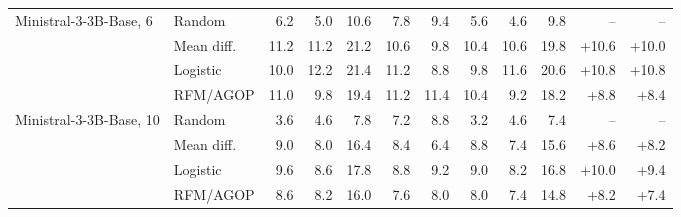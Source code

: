 \begin{table}[t]
\begin{tabular}{llrrrrrrrrrr}
\midrule
Ministral-3-3B-Base, 6 & Random & 6.2 & 5.0 & 10.6 & 7.8 & 9.4 & 5.6 & 4.6 & 9.8 & -- & -- \\
 & Mean diff. & 11.2 & 11.2 & 21.2 & 10.6 & 9.8 & 10.4 & 10.6 & 19.8 & +10.6 & +10.0 \\
 & Logistic & 10.0 & 12.2 & 21.4 & 11.2 & 8.8 & 9.8 & 11.6 & 20.6 & +10.8 & +10.8 \\
 & RFM/AGOP & 11.0 & 9.8 & 19.4 & 11.2 & 11.4 & 10.4 & 9.2 & 18.2 & +8.8 & +8.4 \\
\addlinespace[0.8pt]
Ministral-3-3B-Base, 10 & Random & 3.6 & 4.6 & 7.8 & 7.2 & 8.8 & 3.2 & 4.6 & 7.4 & -- & -- \\
 & Mean diff. & 9.0 & 8.0 & 16.4 & 8.4 & 6.4 & 8.8 & 7.4 & 15.6 & +8.6 & +8.2 \\
 & Logistic & 9.6 & 8.6 & 17.8 & 8.8 & 9.2 & 9.0 & 8.2 & 16.8 & +10.0 & +9.4 \\
 & RFM/AGOP & 8.6 & 8.2 & 16.0 & 7.6 & 8.0 & 8.0 & 7.4 & 14.8 & +8.2 & +7.4 \\
\bottomrule
\end{tabular}
\end{table}
